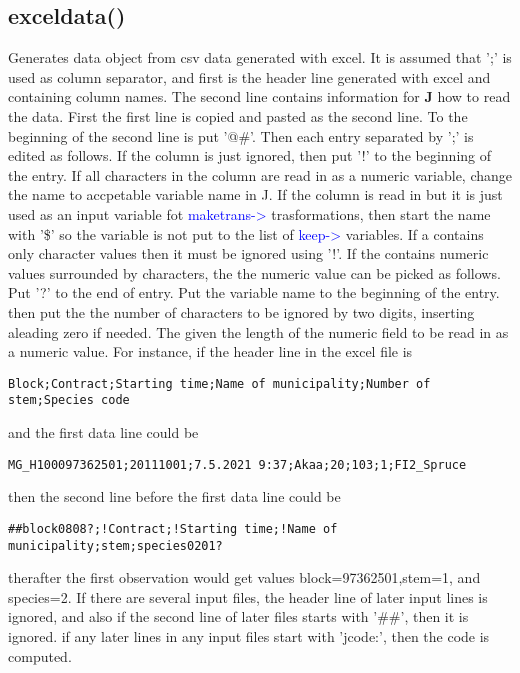\subsection{\textcolor{VioletRed}{exceldata}()}
\label{exceldata}
Generates data object from csv data generated with excel. It is assumed that ';' is used as column separator,
and first is the header line generated with excel and containing column names.
The second line contains information for \textbf{J} how to read the data.
First the first line is copied and pasted as the second line. To the beginning of the second line is put
'@\#'. Then each entry separated by ';' is edited as follows. If the column is just ignored, then
put '!' to the beginning of the entry. If all characters in the column are read in as
a numeric variable, change the name to accpetable variable name in J.
If the column is read in but it is just used as an input variable fot
\textcolor{blue}{maketrans->} trasformations, then start the name with '\$' so the variable is not put to
the list of \textcolor{blue}{keep->} variables. If a contains only character values then it must
be ignored using '!'. If the contains numeric values surrounded by characters, the the numeric value can be picked
as follows. Put '?' to the end of entry. Put the variable name to the beginning of the entry.
then put the the number of characters to be ignored by two digits, inserting
aleading zero if needed. The given the length of the numeric field to be read in as a numeric value.
For instance, if the header line in the excel file is
\color{Green}
\begin{verbatim}
Block;Contract;Starting time;Name of municipality;Number of stem;Species code
\end{verbatim}
\color{Black}
and the first data line could be
\color{Green}
\begin{verbatim}
MG_H100097362501;20111001;7.5.2021 9:37;Akaa;20;103;1;FI2_Spruce
\end{verbatim}
\color{Black}
then the second line before the first data line could be
\color{Green}
\begin{verbatim}
##block0808?;!Contract;!Starting time;!Name of municipality;stem;species0201?
\end{verbatim}
\color{Black}
therafter the first observation would get values block=97362501,stem=1, and
species=2.
If there are several input files, the header line of later input lines is ignored, and
also if the second line of later files starts with '\#\#', then it is ignored.
if any later lines in any input files start with 'jcode:', then the code is computed.
